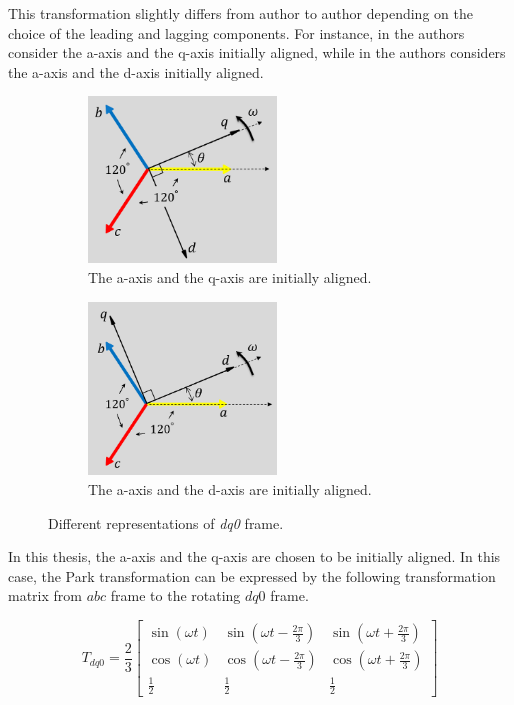 This transformation slightly differs from author to author depending on the
choice of the leading and lagging components. For instance, in
\cite{sauer2017power} the authors consider the a-axis and the q-axis initially
aligned, while in \cite{krause2002analysis} the authors considers the a-axis and
the d-axis initially aligned.

\begin{figure}[!ht]
    \centering
    \begin{subfigure}{.5\textwidth}
      \centering
      \includegraphics[width=5cm]{images/park_transform_axes_01.png}
      \caption{The a-axis and the q-axis are initially aligned.}
      \label{fig:park_transform_axes_01}
    \end{subfigure}%
    \begin{subfigure}{.5\textwidth}
      \centering
      \includegraphics[width=5cm]{images/park_transform_axes_02.png}
      \caption{The a-axis and the d-axis are initially aligned.}
      \label{fig:park_transform_axes_2}
    \end{subfigure}
    \caption{Different representations of \textit{dq0} frame.}
    \label{fig:park_transform_axes}
\end{figure}

In this thesis, the a-axis and the q-axis are chosen to be initially aligned. In this
case, the Park transformation can be expressed by the following transformation matrix
from $abc$ frame to the rotating $dq0$ frame.

\begin{equation}
    T_{dq0} = 
    \frac{2}{3}
    \begin{bmatrix}
        \sin{(\omega t)} & \sin{\left(\omega t - \frac{2\pi}{3}\right)} & \sin{\left(\omega t + \frac{2\pi}{3}\right)}\\
        \cos{(\omega t)} & \cos{\left(\omega t - \frac{2\pi}{3}\right)} & \cos{\left(\omega t + \frac{2\pi}{3}\right)}\\
        \frac{1}{2} & \frac{1}{2} & \frac{1}{2}
    \end{bmatrix}
    \label{eq:park_transformation}
\end{equation}

